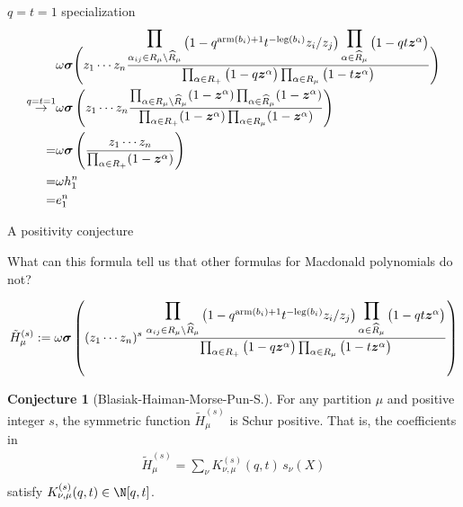 \documentclass[dvipsnames,handout]{beamer}
\newcommand{\zz}{{\boldsymbol z}}
\newcommand{\sigmabold}{\boldsymbol \sigma}
\newcommand{\Htild}{\tilde{H}}
\newcommand{\leg}{{\mathrm{leg}}}
\newcommand{\arm}{{\mathrm{arm}}}
\newcommand{\bbb}{{s}}
\theoremstyle{definition}
\newtheorem{conjecture}[theorem]{Conjecture}
\newcounter{c}
\begin{document}
\begin{frame}{\(q=t=1\) specialization}
  \begin{align*}
          & \omega \sigmabold \Bigg( z_1 \cdots z_n
\frac{
\displaystyle\prod_{\alpha_{ij} \in R_\mu \setminus \widehat{R}_\mu }
 \raisebox{-1.4mm}{$\big(1- q^{\arm(b_i)+1} t^{-\leg(b_i)} z_i/z_j \big)$}
\displaystyle\prod_{\alpha \in \widehat{R}_{\mu}}
 \raisebox{-1.4mm}{$\big(1-q  t\zz^\alpha \big)$} } {\prod_{\alpha \in R_+} \big(1-q  \zz^\alpha\big)
\prod_{\alpha \in R_\mu} \big(1-t  \zz^\alpha\big)} 
           \Bigg) \\
    \overset{q=t=1}{\to} & \omega \sigmabold \left( z_1\cdots z_n
    \frac{\prod_{\alpha \in R_\mu \setminus \widehat{R}_\mu}
    (1-\zz^\alpha) \prod_{\alpha \in \widehat{R}_\mu}(1-\zz^\alpha)}{\prod_{\alpha \in R_+}
    (1-\zz^\alpha) \prod_{\alpha \in R_\mu} (1-\zz^\alpha)}\right) \\
    = & \omega \sigmabold\left(\frac{z_1 \cdots z_n}{\prod_{\alpha \in R_+}
      (1-\zz^\alpha)}\right) \\
    = & \omega h_1^n \\
    = & e_1^n
  \end{align*}
\end{frame}
\begin{frame}{A positivity conjecture}
  \begin{center}
What can this formula tell us that other formulas for Macdonald polynomials do not?
\end{center}
\pause


\vspace{-3mm}
\vspace{-1mm}
{\small \begin{align*}
  \Htild^{(s)}_{\mu} := \omega \sigmabold  \left( (z_1\cdots z_n)^s \,
\frac{
 \displaystyle\prod_{\alpha_{ij} \in R_\mu \setminus \widehat{R}_\mu }
 \raisebox{-1.4mm}{$\big(1- q^{\arm(b_i)+1} t^{-\leg(b_i)} z_i/z_j \big)$}
\displaystyle\prod_{\alpha \in \widehat{R}_{\mu}}
 \raisebox{-1.4mm}{$\big(1-q  t \zz^\alpha \big)$} } {\prod_{\alpha \in R_+} \big(1-q  \zz^\alpha\big)
\prod_{\alpha \in R_\mu} \big(1-t  \zz^\alpha\big)}\right)
\end{align*}}


\vspace{-1.4mm}
\begin{conjecture}[Blasiak-Haiman-Morse-Pun-S.]
For any partition  $\mu$ and positive integer $s$, the symmetric function
 $\Htild^{(s)}_{\mu}$ is Schur positive.
That is, the coefficients in
\vspace{-1mm}
\begin{align*}
\Htild^{(s)}_{\mu}
= \sum_{\nu } K^{(s)} _{\nu , \mu}(q,t)\, s_\nu(X)  \\[-10mm]
\end{align*}
satisfy $K^{(\bbb)}_{\nu , \mu}(q,t)\in \N[q,t]$.
\end{conjecture}
\end{frame}
\end{document}
